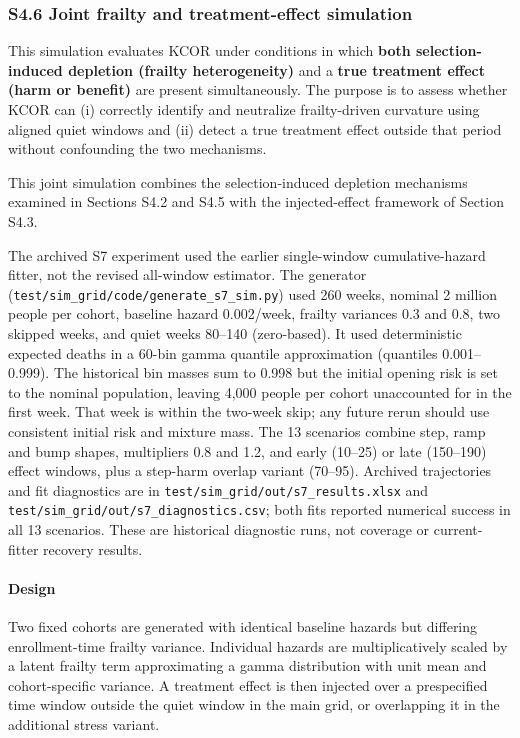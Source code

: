 \documentclass[
]{article}
\begin{document}
\subsubsection{S4.6 Joint frailty and treatment-effect simulation}\label{s4.6-joint-frailty-and-treatment-effect-simulation}

This simulation evaluates KCOR under conditions in which \textbf{both selection-induced depletion (frailty heterogeneity)} and a \textbf{true treatment effect (harm or benefit)} are present simultaneously. The purpose is to assess whether KCOR can (i) correctly identify and neutralize frailty-driven curvature using aligned quiet windows and (ii) detect a true treatment effect outside that period without confounding the two mechanisms.

This joint simulation combines the selection-induced depletion mechanisms examined in Sections S4.2 and S4.5 with the injected-effect framework of Section S4.3.

The archived S7 experiment used the earlier single-window cumulative-hazard fitter, not the revised all-window estimator. The generator (\texttt{test/sim\_grid/code/generate\_s7\_sim.py}) used 260 weeks, nominal 2 million people per cohort, baseline hazard 0.002/week, frailty variances 0.3 and 0.8, two skipped weeks, and quiet weeks 80--140 (zero-based). It used deterministic expected deaths in a 60-bin gamma quantile approximation (quantiles 0.001--0.999). The historical bin masses sum to 0.998 but the initial opening risk is set to the nominal population, leaving 4,000 people per cohort unaccounted for in the first week. That week is within the two-week skip; any future rerun should use consistent initial risk and mixture mass. The 13 scenarios combine step, ramp and bump shapes, multipliers 0.8 and 1.2, and early (10--25) or late (150--190) effect windows, plus a step-harm overlap variant (70--95). Archived trajectories and fit diagnostics are in \texttt{test/sim\_grid/out/s7\_results.xlsx} and \texttt{test/sim\_grid/out/s7\_diagnostics.csv}; both fits reported numerical success in all 13 scenarios. These are historical diagnostic runs, not coverage or current-fitter recovery results.

\paragraph{Design}\label{design}

Two fixed cohorts are generated with identical baseline hazards but differing enrollment-time frailty variance. Individual hazards are multiplicatively scaled by a latent frailty term approximating a gamma distribution with unit mean and cohort-specific variance. A treatment effect is then injected over a prespecified time window outside the quiet window in the main grid, or overlapping it in the additional stress variant.
\end{document}
